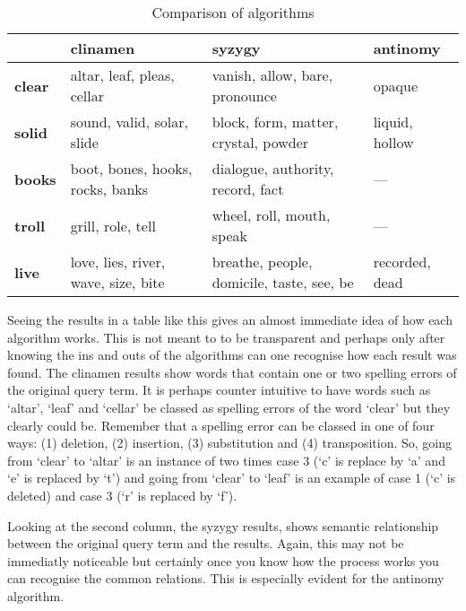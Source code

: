 \begin{table}[htb]
  \begin{tabu}{X[1,L]|X[3,L]X[3,L]X[2,L]}
  \toprule
  &
  \textbf{clinamen}
  &
  \textbf{syzygy}
  &
  \textbf{antinomy}
  \\ \midrule
  \textbf{clear}
  &
  altar, leaf, pleas, cellar
  &
  vanish, allow, bare, pronounce
  &
  opaque
  \\ \midrule
  \textbf{solid}
  &
  sound, valid, solar, slide
  &
  block, form, matter, crystal, powder
  &
  liquid, hollow
  \\ \midrule
  \textbf{books}
  &
  boot, bones, hooks, rocks, banks
  &
  dialogue, authority, record, fact
  &
  ---
  \\ \midrule
  \textbf{troll}
  &
  grill, role, tell
  &
  wheel, roll, mouth, speak
  &
  ---
  \\ \midrule
  \textbf{live}
  &
  love, lies, river, wave, size, bite
  &
  breathe, people, domicile, taste, see, be
  &
  recorded, dead
  \\ \bottomrule
  \end{tabu}
\caption[Comparison of algorithms]{Comparison of algorithms}
\label{algorithmscomp}
\end{table}

Seeing the results in a table like this gives an almost immediate idea of how each algorithm works. This is not meant to to be transparent and perhaps only after knowing the ins and outs of the algorithms can one recognise how each result was found. The clinamen results show words that contain one or two spelling errors of the original query term. It is perhaps counter intuitive to have words such as `altar', `leaf' and `cellar' be classed as spelling errors of the word `clear' but they clearly could be. Remember that a spelling error can be classed in one of four ways: (1) deletion, (2) insertion, (3) substitution and (4) transposition. So, going from `clear' to `altar' is an instance of two times case 3 (`c' is replace by `a' and `e' is replaced by `t') and going from  `clear' to `leaf' is an example of case 1 (`c' is deleted) and case 3 (`r' is replaced by `f').

Looking at the second column, the syzygy results, shows semantic relationship between the original query term and the results. Again, this may not be immediatly noticeable but certainly once you know how the process works you can recognise the common relations. This is especially evident for the antinomy algorithm.

